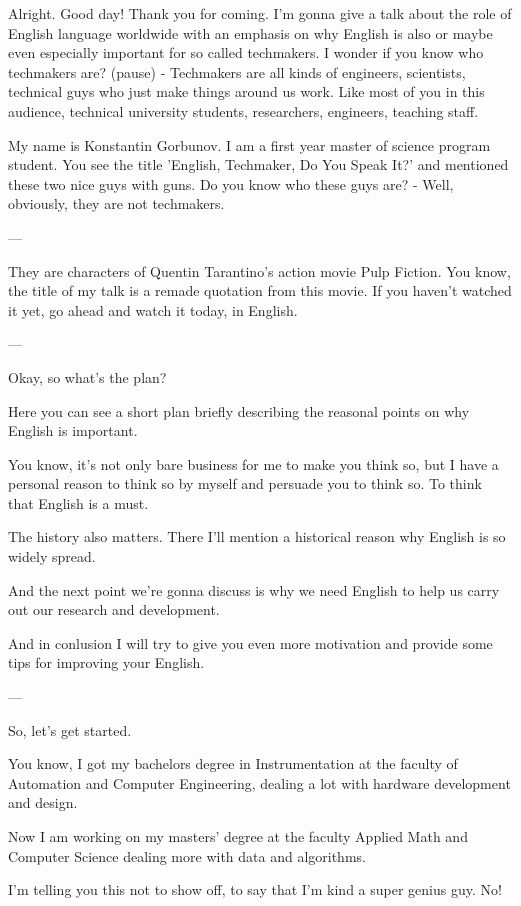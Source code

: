 \documentclass[a4paper, 14pt]{extarticle}
\begin{document}
Alright. Good day! Thank you for coming. I'm gonna give a talk about the role
of English language worldwide with an emphasis on why English is also or maybe
even especially important for so called techmakers. I wonder if you know who
techmakers are? (pause) - Techmakers are all kinds of engineers, scientists,
technical guys who just make things around us work. Like
most of you in this audience, technical university students,
researchers, engineers, teaching staff. 

My name is Konstantin Gorbunov. I am a first year master of science program
student. You see the title 'English, Techmaker, Do You Speak It?' and mentioned
these two nice guys with guns. Do you know who these guys are? - Well, obviously,
they are not techmakers. 

---

They are characters of Quentin Tarantino's action movie Pulp Fiction. You know,
the title of my talk is a remade quotation from this movie. If you haven't
watched it yet, go ahead and watch it today, in English.

---

Okay, so what's the plan?

Here you can see a short plan briefly describing the reasonal points on why
English is important.

You know, it's not only bare business for me to make you think so, but
I have a personal reason to think so by myself and persuade you to think so.
To think that English is a must.

The history also matters. There I'll mention a historical reason why English is
so widely spread.

And the next point we're gonna discuss is why we need English to help us
carry out our research and development.

And in conlusion I will try to give you even more motivation and provide some
tips for improving your English.

---

So, let's get started.

You know, I got my bachelors degree in Instrumentation at the faculty of
Automation and Computer Engineering, dealing a lot with hardware development
and design.

Now I am working on my masters' degree at the faculty Applied Math and Computer
Science dealing more with data and algorithms.

I'm telling you this not to show off, to say that I'm kind a super genius guy.
No!
\end{document}
